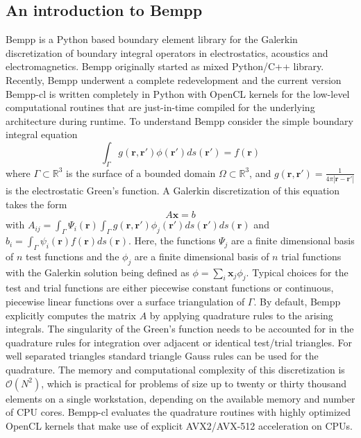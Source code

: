 \subsection{An introduction to Bempp}
Bempp \cite{Betcke2021} is a Python based boundary element library for the Galerkin discretization of boundary integral operators in electrostatics, acoustics and electromagnetics.
Bempp originally started as mixed Python/C++ library.
Recently, Bempp underwent a complete redevelopment and the current version Bempp-cl is written completely in Python with OpenCL kernels for the low-level computational routines that are just-in-time compiled for the underlying architecture during runtime.
To understand Bempp consider the simple boundary integral equation
$$
\int_{\Gamma} g(\mathbf{r}, \mathbf{r'}) \phi(\mathbf{r'})ds(\mathbf{r'}) = f(\mathbf{r})
$$
where $\Gamma\subset\mathbb{R}^3$ is the surface of a bounded domain $\Omega\subset\mathbb{R}^3$, and $g(\mathbf{r}, \mathbf{r'}) = \frac{1}{4\pi|\mathbf{r}-\mathbf{r'}|}$ is the electrostatic Green's function.
A Galerkin discretization of this equation takes the form
$$
A\mathbf{x} = b
$$
with $A_{ij} = \int_{\Gamma}\Psi_i(\mathbf{r})\int_{\Gamma}g(\mathbf{r}, \mathbf{r'})\phi_j(\mathbf{r'})ds(\mathbf{r'})ds(\mathbf{r})$ and $b_i = \int_{\Gamma}\psi_i(\mathbf{r})f(\mathbf{r})ds(\mathbf{r})$.
Here, the functions $\Psi_j$ are a finite dimensional basis of $n$ test functions and the $\phi_j$ are a finite dimensional basis of $n$ trial functions with the Galerkin solution being defined as $\phi=\sum_{i}\mathbf{x}_j\phi_j$.
Typical choices for the test and trial functions are either piecewise constant functions or continuous, piecewise linear functions over a surface triangulation of $\Gamma$. 
By default, Bempp explicitly computes the matrix $A$ by applying quadrature rules to the arising integrals.
The singularity of the Green's function needs to be accounted for in the quadrature rules for integration over adjacent or identical test/trial triangles.
For well separated triangles standard triangle Gauss rules can be used for the quadrature.
The memory and computational complexity of this discretization is $\mathcal{O}(N^2)$, which is practical for problems of size up to twenty or thirty thousand elements on a single workstation, depending on the available memory and number of CPU cores.
Bempp-cl evaluates the quadrature routines with highly optimized OpenCL kernels that make use of explicit AVX2/AVX-512 acceleration on CPUs.

